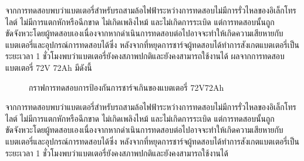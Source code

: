 จากการทดสอบพบว่าแบตเตอรี่สำหรับรถสามล้อไฟฟ้าระหว่างการทดสอบไม่มีการรั่วไหลของอิเล็กโทรไลต์ ไม่มีการแตกหักหรือฉีกขาด ไม่เกิดเพลิงไหม้ และไม่เกิดการระเบิด
แต่การทดสอบนั้นถูกขัดจังหวะโดยผู้ทดสอบเองเนื่องจากหากดำเนินการทดสอบต่อไปอาจจะทำให้เกิดความเสียหายกับแบตเตอรี่และอุปกรณ์การทดสอบได้ซึ่ง
หลังจากที่หยุดการชาร์จผู้ทดสอบได้ทำการสังเกตแบตเตอรี่เป็นระยะเวลา 1 ชั่วโมงพบว่าแบตเตอรี่ยังคงสภาพปกติและยังคงสามารถใช้งานได้
\newline\hspace*{2cm}
ผลจากการทดสอบแบตเตอรี่ 72V 72Ah มีดังนี้
\begin{center}
	\begin{figure}[H]
		\centering
		\captionsetup{justification=centering,margin=2cm}
		\caption{กราฟการทดสอบการป้องกันการชาร์จเกินของแบตเตอรี่ 72V72Ah}
	\end{figure}
\end{center}
จากการทดสอบพบว่าแบตเตอรี่สำหรับรถสามล้อไฟฟ้าระหว่างการทดสอบไม่มีการรั่วไหลของอิเล็กโทรไลต์ ไม่มีการแตกหักหรือฉีกขาด ไม่เกิดเพลิงไหม้ และไม่เกิดการระเบิด
แต่การทดสอบนั้นถูกขัดจังหวะโดยผู้ทดสอบเองเนื่องจากหากดำเนินการทดสอบต่อไปอาจจะทำให้เกิดความเสียหายกับแบตเตอรี่และอุปกรณ์การทดสอบได้ซึ่ง
หลังจากที่หยุดการชาร์จผู้ทดสอบได้ทำการสังเกตแบตเตอรี่เป็นระยะเวลา 1 ชั่วโมงพบว่าแบตเตอรี่ยังคงสภาพปกติและยังคงสามารถใช้งานได้
